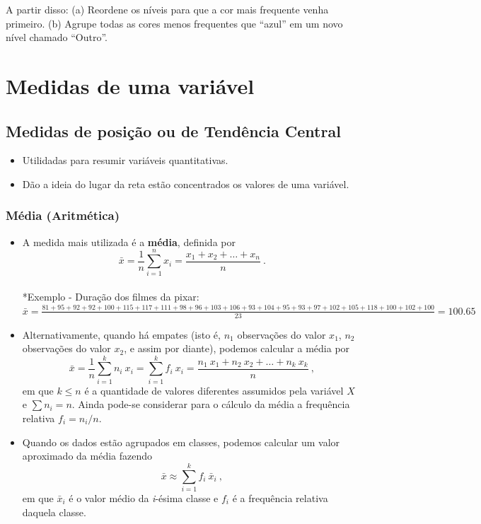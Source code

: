 \documentclass[
]{book}
\providecommand{\tightlist}{%
  \setlength{\itemsep}{0pt}\setlength{\parskip}{0pt}}
\begin{document}
A partir disso:
(a) Reordene os níveis para que a cor mais frequente venha primeiro.
(b) Agrupe todas as cores menos frequentes que ``azul'' em um novo nível chamado ``Outro''.

\chapter{Medidas de uma variável}\label{medidas_uma_variavel_5}

\section{Medidas de posição ou de Tendência Central}\label{medidas-de-posiuxe7uxe3o-ou-de-tenduxeancia-central}

\begin{itemize}
\tightlist
\item
  Utilidadas para resumir variáveis quantitativas.\\
\item
  Dão a ideia do lugar da reta estão concentrados os valores de uma variável.
\end{itemize}

\subsection{Média (Aritmética)}\label{muxe9dia-aritmuxe9tica}

\begin{itemize}
\item
  A medida mais utilizada é a \textbf{média}, definida por \[\displaystyle \bar{x} = \frac{1}{n}\sum_{i=1}^n x_i = \dfrac{x_1+x_2+\ldots+x_n}{n}~.\]\\
  *Exemplo - Duração dos filmes da pixar: \(\bar{x} = \frac{81+95+92+92+100+115+117+111+98+96+103+106+93+104+95+93+97+102+105+118+100+102+100}{23}=100.65\)
\item
  Alternativamente, quando há empates (isto é, \(n_1\) observações do valor \(x_1\), \(n_2\) observações do valor \(x_2\), e assim por diante), podemos calcular a média por \[\displaystyle \bar{x} = \frac{1}{n}\sum_{i=1}^k n_i~x_i = \sum_{i=1}^k f_i~x_i = \frac{n_1~x_1+n_2~x_2+\ldots+n_k~x_k}{n}~,\] em que \(k\leq n\) é a quantidade de valores diferentes assumidos pela variável \(X\) e \(\sum n_i = n\). Ainda pode-se considerar para o cálculo da média a frequência relativa \(f_i = n_i/n\).
\item
  Quando os dados estão agrupados em classes, podemos calcular um valor aproximado da média fazendo \[\displaystyle \bar{x} \approx \sum_{i=1}^k f_i~\bar{x}_i~,\] em que \(\bar{x}_i\) é o valor médio da \emph{i}-ésima classe e \(f_i\) é a frequência relativa daquela classe.
\end{itemize}
\end{document}
